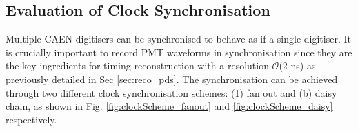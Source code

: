 
\subsection{Evaluation of Clock Synchronisation}
\label{subsec42PMT}

Multiple CAEN digitisers can be synchronised to behave as if a single digitiser.
It is crucially important to record PMT waveforms in synchronisation since they are the key ingredients for timing reconstruction with a resolution $\mathcal{O}$(2 ns) as previously detailed in Sec \ref{sec:reco_pds}.
The synchronisation can be achieved through two different clock synchronisation schemes: (1) fan out and (b) daisy chain, as shown in Fig. \ref{fig:clockScheme_fanout} and \ref{fig:clockScheme_daisy} respectively.

